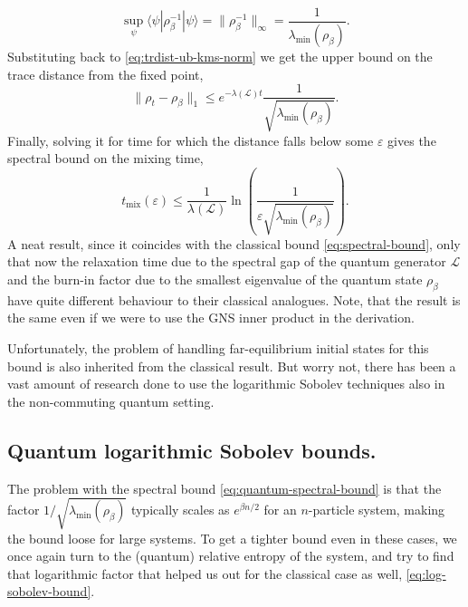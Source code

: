 $$
\sup_{\psi} \langle \psi | \rho_\beta^{-1} | \psi \rangle = \|\rho_\beta^{-1}\|_\infty = \frac{1}{\lambda_{\min}(\rho_\beta)}.
$$
Substituting back to \eqref{eq:trdist-ub-kms-norm} we get the upper bound on the trace distance from the fixed point,
$$
\|\rho_t - \rho_\beta\|_1 \leq e^{-\lambda(\mathcal{L})t} \frac{1}{\sqrt{\lambda_{\min}(\rho_\beta)}}.
$$
Finally, solving it for time for which the distance falls below some $\varepsilon$ gives the spectral bound on the mixing time,
\begin{equation}
    \label{eq:quantum-spectral-bound}
        t_\text{mix}(\varepsilon) \leq \frac{1}{\lambda(\mathcal{L})} \ln \left( \frac{1}{\varepsilon \sqrt{\lambda_{\min}(\rho_\beta)}} \right).
\end{equation}
A neat result, since it coincides with the classical bound \eqref{eq:spectral-bound}, only that now the relaxation time due to the spectral gap of the quantum generator $\mathcal{L}$ and the burn-in factor due to the smallest eigenvalue of the quantum state $\rho_\beta$ have quite different behaviour to their classical analogues. Note, that the result is the same even if we were to use the GNS inner product in the derivation. 

Unfortunately, the problem of handling far-equilibrium initial states for this bound is also inherited from the classical result. But worry not, there has been a vast amount of research done to use the logarithmic Sobolev techniques also in the non-commuting quantum setting. 

\smallskip
\label{sec:prelim-qlsi}
\subsection{Quantum logarithmic Sobolev bounds.} The problem with the spectral bound \eqref{eq:quantum-spectral-bound} is that the factor $1 / \sqrt{\lambda_{\min}(\rho_\beta)}$ typically scales as $e^{\beta n / 2}$ for an $n$-particle system, making the bound loose for large systems. To get a tighter bound even in these cases, we once again turn to the (quantum) relative entropy of the system, and try to find that logarithmic factor that helped us out for the classical case as well, \eqref{eq:log-sobolev-bound}.


